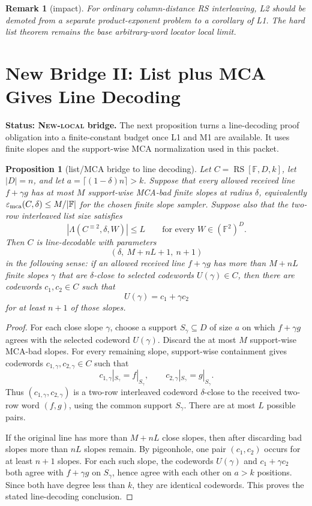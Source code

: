 \documentclass[11pt]{article}
\newtheorem{proposition}{Proposition}
\newtheorem{remark}{Remark}
\newcommand{\F}{\mathbb F}
\newcommand{\RS}{\operatorname{RS}}
\newcommand{\epsmca}{\varepsilon_{\rm mca}}
\newcommand{\Lam}{\Lambda}
\begin{document}
\begin{remark}[impact]
For ordinary column-distance RS interleaving, L2 should be demoted from a
separate product-exponent problem to a corollary of L1.  The hard list theorem
remains the base arbitrary-word locator local limit.
\end{remark}

\section{New Bridge II: List plus MCA Gives Line Decoding}
\label{sec:list-plus-mca-gives-line-decoding}

\textbf{Status: \textsc{New-local} bridge.}
The next proposition turns a line-decoding proof obligation into a finite-constant
budget once L1 and M1 are available.  It uses finite slopes and the support-wise
MCA normalization used in this packet.

\begin{proposition}[list/MCA bridge to line decoding]
\label{prop:list-mca-to-line-decoding-bridge}
Let \(C=\RS[\F,D,k]\), let \(|D|=n\), and let
\(a=\lceil(1-\delta)n\rceil>k\).  Suppose that every allowed received line
\(f+\gamma g\) has at most \(M\) support-wise MCA-bad finite slopes at radius
\(\delta\), equivalently \(\epsmca(C,\delta)\le M/|\F|\) for the chosen finite
slope sampler.  Suppose also that the two-row interleaved list size satisfies
\[
  |\Lam(C^{\equiv2},\delta,W)|\le L
  \qquad\text{for every }W\in(\F^2)^D.
\]
Then \(C\) is line-decodable with parameters
\[
  (\delta,\ M+nL+1,\ n+1)
\]
in the following sense: if an allowed received line \(f+\gamma g\) has more than
\(M+nL\) finite slopes \(\gamma\) that are \(\delta\)-close to selected codewords
\(U(\gamma)\in C\), then there are codewords \(c_1,c_2\in C\) such that
\[
  U(\gamma)=c_1+\gamma c_2
\]
for at least \(n+1\) of those slopes.
\end{proposition}

\begin{proof}
For each close slope \(\gamma\), choose a support \(S_\gamma\subseteq D\) of size
\(a\) on which \(f+\gamma g\) agrees with the selected codeword \(U(\gamma)\).
Discard the at most \(M\) support-wise MCA-bad slopes.  For every remaining
slope, support-wise containment gives codewords \(c_{1,\gamma},c_{2,\gamma}\in C\)
such that
\[
  c_{1,\gamma}|_{S_\gamma}=f|_{S_\gamma},
  \qquad
  c_{2,\gamma}|_{S_\gamma}=g|_{S_\gamma}.
\]
Thus \((c_{1,\gamma},c_{2,\gamma})\) is a two-row interleaved codeword
\(\delta\)-close to the received two-row word \((f,g)\), using the common support
\(S_\gamma\).  There are at most \(L\) possible pairs.

If the original line has more than \(M+nL\) close slopes, then after discarding
bad slopes more than \(nL\) slopes remain.  By pigeonhole, one pair
\((c_1,c_2)\) occurs for at least \(n+1\) slopes.  For each such slope, the
codewords \(U(\gamma)\) and \(c_1+\gamma c_2\) both agree with \(f+\gamma g\) on
\(S_\gamma\), hence agree with each other on \(a>k\) positions.  Since both have
degree less than \(k\), they are identical codewords.  This proves the stated
line-decoding conclusion.
\end{proof}
\end{document}
